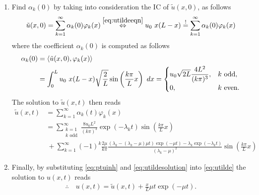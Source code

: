 \documentclass[12pt]{article}
\begin{document}
\begin{enumerate}
	\item Find $\alpha_k(0)$ by taking into consideration the IC of $\tilde{u}(x,0)$, as follows
	      \begin{align}
		      \tilde{u}(x,0) = \sum_{k=1}^{\infty} \alpha_k(0) \varphi_k(x)
		      \stackrel{\eqref{eq:utildeeqn}}{\Leftrightarrow}
		      u_0\ x(L-x) \stackrel{!}{=} \sum_{k=1}^{\infty} \alpha_k(0) \varphi_k(x)
	      \end{align}
	      where the coefficient $\alpha_k(0)$ is computed as follows
	      \begin{align}
		      \alpha_k(0)
		       & = \langle \tilde{u}(x,0),\varphi_k(x) \rangle                                           \notag \\
		       & = \int_0^L u_0\ x (L-x) \sqrt{\frac{2}{L}} \sin\left( \frac{k \pi}{L} x \right) \ dx 
		      =
		      \begin{cases}
			      \displaystyle
			      u_0 \sqrt{2L} \frac{4 L^2}{(k\pi)^3}, & k \text{ odd}, \\
			      0,                                    & k\text{ even}.
		      \end{cases}
	      \end{align}
	      The solution to $\tilde{u}(x,t)$ then reads
	      \begin{equation}
		      \label{eq:utildesolution}
		      \boxed{
			      \begin{aligned}
				      \tilde{u}(x,t)
				       & = \sum_{k=1}^\infty \alpha_k(t) \varphi_k(x)  \\
				       & = \sum_{\substack{k=1                         \\k \text{ odd}}}^\infty \frac{8 u_0 L^2}{(k\pi)^3}
				      \exp(-\lambda_k t)
				      \sin\left( \frac{k \pi}{L} x \right)             \\
				       & \ + \sum_{k=1}^\infty (-1)^k \frac{2\mu}{k \pi}
				      \frac{(\lambda_k - (\lambda_k-\mu)\mu t)\exp(-\mu t) - \lambda_k \exp(-\lambda_k t)}
				      {(\lambda_k - \mu)^2}
				      \sin\left( \frac{k \pi}{L} x \right)
			      \end{aligned}
		      }
	      \end{equation}
	      
	\item Finally, by substituting \eqref{eq:ptuinh} and \eqref{eq:utildesolution}
	      into  \eqref{eq:utilde}
	      the solution to $u(x,t)$ reads
	      \begin{align*}
		      \therefore\quad\boxed{
			      u(x,t) = \tilde{u}(x,t) + \frac{x}{L} \mu t\exp(-\mu t).
		      }
	      \end{align*}
\end{enumerate}
\end{document}
